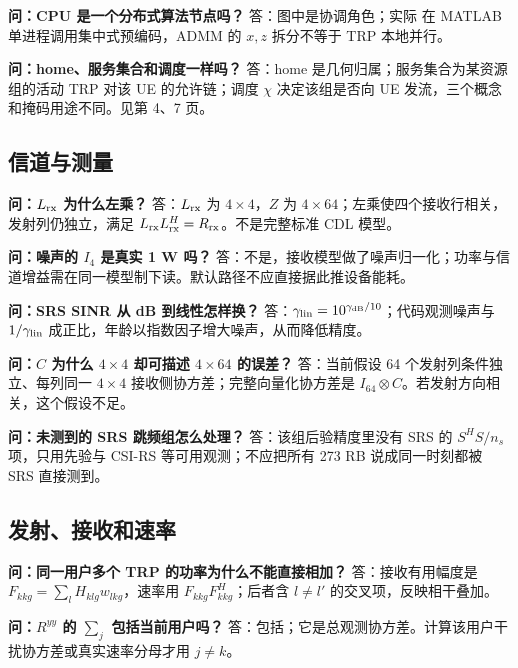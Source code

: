 \documentclass[11pt,a4paper]{ctexart}
\begin{document}
\textbf{问：CPU 是一个分布式算法节点吗？} 答：图中是协调角色；实际  在 MATLAB 单进程调用集中式预编码，ADMM 的 $x,z$ 拆分不等于 TRP 本地并行。\par

\textbf{问：home、服务集合和调度一样吗？} 答：home 是几何归属；服务集合为某资源组的活动 TRP 对该 UE 的允许链；调度 $\chi$ 决定该组是否向 UE 发流，三个概念和掩码用途不同。见第 4、7 页。\par

\subsection*{信道与测量}

\textbf{问：$L_{\rm rx}$ 为什么左乘？} 答：$L_{\rm rx}$ 为 $4\times4$，$Z$ 为 $4\times64$；左乘使四个接收行相关，发射列仍独立，满足 $L_{\rm rx}L_{\rm rx}^H=R_{\rm rx}$。不是完整标准 CDL 模型。\par

\textbf{问：噪声的 $I_4$ 是真实 1 W 吗？} 答：不是，接收模型做了噪声归一化；功率与信道增益需在同一模型制下读。默认路径不应直接据此推设备能耗。\par

\textbf{问：SRS SINR 从 dB 到线性怎样换？} 答：$\gamma_{\rm lin}=10^{\gamma_{\rm dB}/10}$；代码观测噪声与 $1/\gamma_{\rm lin}$ 成正比，年龄以指数因子增大噪声，从而降低精度。\par

\textbf{问：$C$ 为什么 $4\times4$ 却可描述 $4\times64$ 的误差？} 答：当前假设 64 个发射列条件独立、每列同一 $4\times4$ 接收侧协方差；完整向量化协方差是 $I_{64}\otimes C$。若发射方向相关，这个假设不足。\par

\textbf{问：未测到的 SRS 跳频组怎么处理？} 答：该组后验精度里没有 SRS 的 $S^HS/n_s$ 项，只用先验与 CSI-RS 等可用观测；不应把所有 273 RB 说成同一时刻都被 SRS 直接测到。\par

\subsection*{发射、接收和速率}

\textbf{问：同一用户多个 TRP 的功率为什么不能直接相加？} 答：接收有用幅度是 $F_{kkg}=\sum_lH_{klg}w_{lkg}$，速率用 $F_{kkg}F_{kkg}^H$；后者含 $l\ne l'$ 的交叉项，反映相干叠加。\par

\textbf{问：$R^{yy}$ 的 $\sum_j$ 包括当前用户吗？} 答：包括；它是总观测协方差。计算该用户干扰协方差或真实速率分母才用 $j\ne k$。\par
\end{document}
